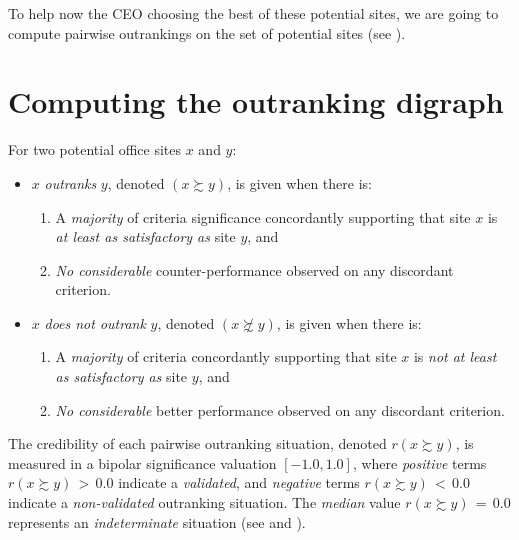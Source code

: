 To help now the CEO choosing the best of these potential sites, we are going to compute pairwise outrankings on the set of potential sites (see \citet{BIS-2013}).

\section{Computing the outranking digraph}
\label{sec:6.2}

\begin{definition}
For two potential office sites $x$ and $y$:
\begin{itemize}
\item $x$ \emph{outranks} $y$, denoted $(x \succsim y)$, is given when there is:
   \begin{enumerate}
     \item A \emph{majority} of criteria significance concordantly supporting that site $x$ is \emph{at least as satisfactory as} site $y$, and
     \item \emph{No considerable} counter-performance observed on any discordant criterion.      
    \end{enumerate}
\item $x$ \emph{does not outrank} $y$, denoted $(x \not\succsim y)$, is given when there is:
   \begin{enumerate}
    \item A \emph{majority} of criteria concordantly supporting that site $x$ is \emph{not at least as satisfactory as} site $y$, and
    \item \emph{No considerable} better performance observed on any discordant criterion.
    \end{enumerate}
\end{itemize}
\end{definition}
The credibility of each pairwise outranking situation, denoted $r(x \succsim y)$, is measured in a bipolar significance valuation $[-1.0, 1.0]$, where \emph{positive} terms $r(x \succsim y)\, >\, 0.0$ indicate a \emph{validated}, and \emph{negative} terms $r(x \succsim y)\, <\, 0.0$ indicate a \emph{non-validated} outranking situation. The \emph{median} value $r(x \succsim y)\, = \,0.0$ represents an \emph{indeterminate} situation (see \citet{BIS-2004a} and \citet{BIS-2013}).   


